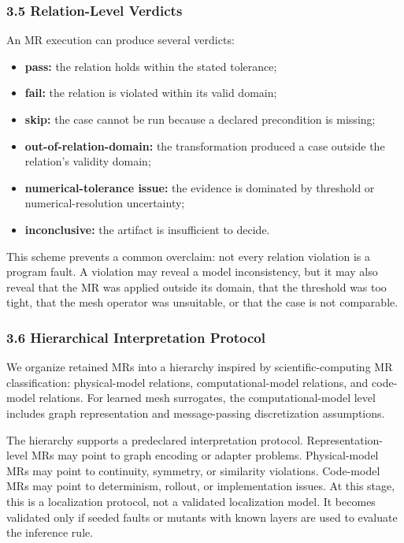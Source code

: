 \subsubsection{3.5 Relation-Level
Verdicts}\label{relation-level-verdicts}

An MR execution can produce several verdicts:

\begin{itemize}
\tightlist
\item
  \textbf{pass:} the relation holds within the stated tolerance;
\item
  \textbf{fail:} the relation is violated within its valid domain;
\item
  \textbf{skip:} the case cannot be run because a declared precondition
  is missing;
\item
  \textbf{out-of-relation-domain:} the transformation produced a case
  outside the relation's validity domain;
\item
  \textbf{numerical-tolerance issue:} the evidence is dominated by
  threshold or numerical-resolution uncertainty;
\item
  \textbf{inconclusive:} the artifact is insufficient to decide.
\end{itemize}

This scheme prevents a common overclaim: not every relation violation is
a program fault. A violation may reveal a model inconsistency, but it
may also reveal that the MR was applied outside its domain, that the
threshold was too tight, that the mesh operator was unsuitable, or that
the case is not comparable.

\subsubsection{3.6 Hierarchical Interpretation
Protocol}\label{hierarchical-interpretation-protocol}

We organize retained MRs into a hierarchy inspired by
scientific-computing MR classification: physical-model relations,
computational-model relations, and code-model relations. For learned
mesh surrogates, the computational-model level includes graph
representation and message-passing discretization assumptions.

The hierarchy supports a predeclared interpretation protocol.
Representation-level MRs may point to graph encoding or adapter
problems. Physical-model MRs may point to continuity, symmetry, or
similarity violations. Code-model MRs may point to determinism, rollout,
or implementation issues. At this stage, this is a localization
protocol, not a validated localization model. It becomes validated only
if seeded faults or mutants with known layers are used to evaluate the
inference rule.

